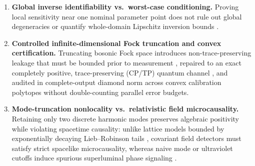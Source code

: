 \documentclass[11pt,letterpaper]{article}
\theoremstyle{definition}
\providecommand{\tightlist}{\setlength{\itemsep}{2pt}\setlength{\parskip}{0pt}}
\begin{document}
\begin{enumerate}
\def\labelenumi{\arabic{enumi}.}
\tightlist
\item
  \textbf{Global inverse identifiability vs.~worst-case conditioning.}
  Proving local sensitivity near one nominal parameter point does not
  rule out global degeneracies or quantify whole-domain Lipschitz
  inversion bounds \citep{hoeffding1963, clopperPearson1934}.
\item
  \textbf{Controlled infinite-dimensional Fock truncation and convex
  certification.} Truncating bosonic Fock space introduces
  non-trace-preserving leakage that must be bounded prior to measurement
  \citep{woods2014, mascherpa2017, tamascelli2018}, repaired to an exact
  completely positive, trace-preserving (CP/TP) quantum channel
  \citep{nielsenChuang2010, watrous2018}, and audited in complete-output
  diamond norm \citep{kitaev1997, aharonovKitaevNisan1998} across convex
  calibration polytopes without double-counting parallel error budgets.
\item
  \textbf{Mode-truncation nonlocality vs.~relativistic field
  microcausality.} Retaining only two discrete harmonic modes preserves
  algebraic positivity while violating spacetime causality: unlike
  lattice models bounded by exponentially decaying Lieb--Robinson tails
  \citep{liebRobinson1972}, covariant field detectors must satisfy
  strict spacelike microcausality, whereas naive mode or ultraviolet
  cutoffs induce spurious superluminal phase signaling
  \citep{haag1996, wald1994, unruhWald1984, sorkin1993, martinMartinez2015, fewsterVerch2020, bostelmann2021, deRamon2021, poloGomez2022}.
\end{enumerate}
\end{document}
